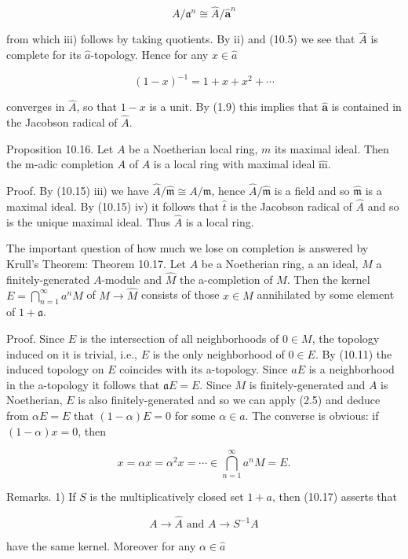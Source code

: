 \documentclass{standalone}
\theoremstyle{definition}
\theoremstyle{remark}
\begin{document}
\[
A / \mathfrak{a}^{n} \cong \hat{A} / \hat{\mathbf{a}}^{n}
\]

from which iii) follows by taking quotients. By ii) and (10.5) we see that $\hat{A}$ is complete for its $\hat{a}$-topology. Hence for any $x \in \hat{a}$

\[
(1-x)^{-1}=1+x+x^{2}+\cdots
\]

converges in $\hat{A}$, so that $1-x$ is a unit. By (1.9) this implies that $\hat{\mathbf{a}}$ is contained in the Jacobson radical of $\hat{A}$.

Proposition 10.16. Let $A$ be a Noetherian local ring, $m$ its maximal ideal. Then the $\mathrm{m}$-adic completion $A$ of $A$ is a local ring with maximal ideal $\hat{\mathrm{m}}$.

Proof. By (10.15) iii) we have $\hat{A} / \hat{\mathfrak{m}} \cong A / \mathfrak{m}$, hence $\hat{A} / \hat{\mathfrak{m}}$ is a field and so $\hat{\mathfrak{m}}$ is a maximal ideal. By (10.15) iv) it follows that $\hat{t}$ is the Jacobson radical of $\hat{A}$ and so is the unique maximal ideal. Thus $\hat{A}$ is a local ring.

The important question of how much we lose on completion is answered by Krull's Theorem: Theorem 10.17. Let $A$ be a Noetherian ring, a an ideal, $M$ a finitely-generated $A$-module and $\hat{M}$ the a-completion of $M$. Then the kernel $E=\bigcap_{n=1}^{\infty} a^{n} M$ of $M \rightarrow \hat{M}$ consists of those $x \in M$ annihilated by some element of $1+\mathfrak{a}$.

Proof. Since $E$ is the intersection of all neighborhoods of $0 \in M$, the topology induced on it is trivial, i.e., $E$ is the only neighborhood of $0 \in E$. By (10.11) the induced topology on $E$ coincides with its a-topology. Since $a E$ is a neighborhood in the a-topology it follows that $\mathfrak{a} E=E$. Since $M$ is finitely-generated and $A$ is Noetherian, $E$ is also finitely-generated and so we can apply (2.5) and deduce from $\alpha E=E$ that $(1-\alpha) E=0$ for some $\alpha \in a$. The converse is obvious: if $(1-\alpha) x=0$, then

\[
x=\alpha x=\alpha^{2} x=\cdots \in \bigcap_{n=1}^{\infty} a^{n} M=E .
\]

Remarks. 1) If $S$ is the multiplicatively closed set $1+a$, then (10.17) asserts that

\[
A \rightarrow \hat{A} \text { and } A \rightarrow S^{-1} A
\]

have the same kernel. Moreover for any $\alpha \in \hat{a}$
\end{document}
